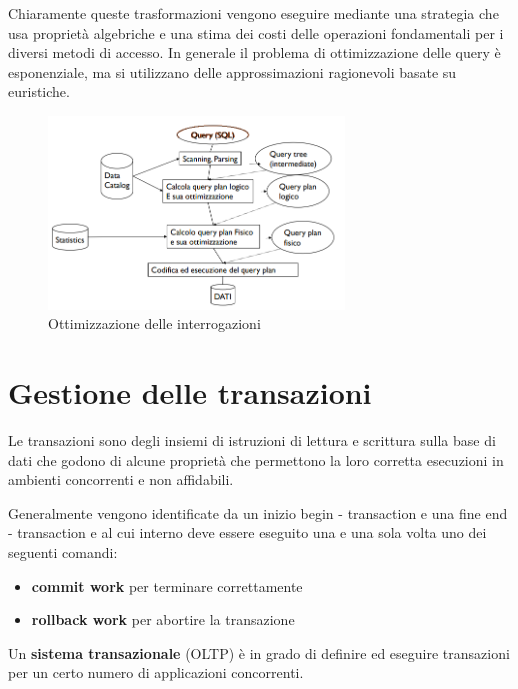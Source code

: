 Chiaramente queste trasformazioni vengono eseguire mediante una strategia che
usa proprietà algebriche e una stima dei costi delle operazioni fondamentali per
i diversi metodi di accesso. In generale il problema di ottimizzazione delle
query è esponenziale, ma si utilizzano delle approssimazioni ragionevoli basate
su euristiche.
\begin{figure}
    \centering
    \includegraphics[width=0.7\textwidth]{./img/DBMS/Ottimizzazione_query.png}
    \caption{Ottimizzazione delle interrogazioni}
    \label{fig:Query_Optimization}
\end{figure}
\section{Gestione delle transazioni}
Le transazioni sono degli insiemi di istruzioni di lettura e scrittura sulla base
di dati che godono di alcune proprietà che permettono la loro corretta esecuzioni
in ambienti concorrenti e non affidabili.

Generalmente vengono identificate da un inizio begin - transaction e una fine
end - transaction e al cui interno deve essere eseguito una e una sola
volta uno dei seguenti comandi:
\begin{itemize}
    \item \textbf{commit work} per terminare correttamente
    \item \textbf{rollback work} per abortire la transazione
\end{itemize}

Un \textbf{sistema transazionale} (OLTP) è in grado di definire ed eseguire
transazioni per un certo numero di applicazioni concorrenti.

